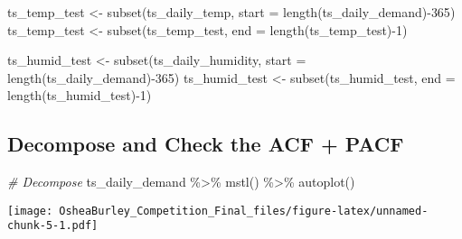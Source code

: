 \documentclass[
]{article}
\newenvironment{Shaded}{\begin{snugshade}}{\end{snugshade}}
\newcommand{\AttributeTok}[1]{\textcolor[rgb]{0.77,0.63,0.00}{#1}}
\newcommand{\CommentTok}[1]{\textcolor[rgb]{0.56,0.35,0.01}{\textit{#1}}}
\newcommand{\DecValTok}[1]{\textcolor[rgb]{0.00,0.00,0.81}{#1}}
\newcommand{\FunctionTok}[1]{\textcolor[rgb]{0.00,0.00,0.00}{#1}}
\newcommand{\NormalTok}[1]{#1}
\newcommand{\OtherTok}[1]{\textcolor[rgb]{0.56,0.35,0.01}{#1}}
\newcommand{\SpecialCharTok}[1]{\textcolor[rgb]{0.00,0.00,0.00}{#1}}
\begin{document}
\begin{Shaded}
\begin{Highlighting}[]
\NormalTok{ts\_temp\_test }\OtherTok{\textless{}{-}} \FunctionTok{subset}\NormalTok{(ts\_daily\_temp,}
                          \AttributeTok{start =} \FunctionTok{length}\NormalTok{(ts\_daily\_demand)}\SpecialCharTok{{-}}\DecValTok{365}\NormalTok{)}
\NormalTok{ts\_temp\_test }\OtherTok{\textless{}{-}} \FunctionTok{subset}\NormalTok{(ts\_temp\_test,}
                         \AttributeTok{end =} \FunctionTok{length}\NormalTok{(ts\_temp\_test)}\SpecialCharTok{{-}}\DecValTok{1}\NormalTok{) }

\NormalTok{ts\_humid\_test }\OtherTok{\textless{}{-}} \FunctionTok{subset}\NormalTok{(ts\_daily\_humidity,}
                          \AttributeTok{start =} \FunctionTok{length}\NormalTok{(ts\_daily\_demand)}\SpecialCharTok{{-}}\DecValTok{365}\NormalTok{)}
\NormalTok{ts\_humid\_test }\OtherTok{\textless{}{-}} \FunctionTok{subset}\NormalTok{(ts\_humid\_test,}
                         \AttributeTok{end =} \FunctionTok{length}\NormalTok{(ts\_humid\_test)}\SpecialCharTok{{-}}\DecValTok{1}\NormalTok{) }
\end{Highlighting}
\end{Shaded}

\hypertarget{decompose-and-check-the-acf-pacf}{%
\subsection{Decompose and Check the ACF +
PACF}\label{decompose-and-check-the-acf-pacf}}

\begin{Shaded}
\begin{Highlighting}[]
\CommentTok{\# Decompose }
\NormalTok{ts\_daily\_demand }\SpecialCharTok{\%\textgreater{}\%} \FunctionTok{mstl}\NormalTok{() }\SpecialCharTok{\%\textgreater{}\%}
  \FunctionTok{autoplot}\NormalTok{()}
\end{Highlighting}
\end{Shaded}

\texttt{[image: OsheaBurley\_Competition\_Final\_files/figure-latex/unnamed-chunk-5-1.pdf]}
\end{document}
